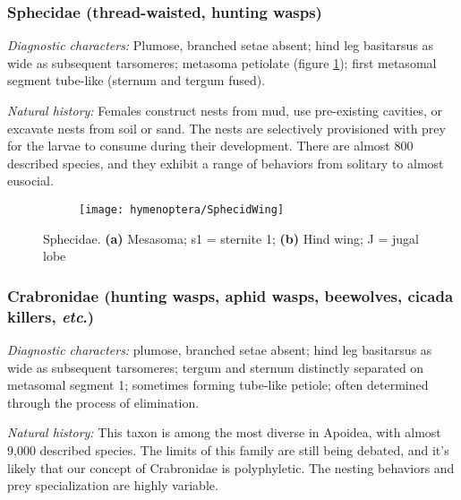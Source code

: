 \subsubsection{Sphecidae (thread-waisted, hunting wasps)}
\noindent{}\textit{Diagnostic characters:} Plumose, branched setae absent; hind leg basitarsus as wide as subsequent tarsomeres; metasoma petiolate (figure \ref{fig:sphecid1}); first metasomal segment tube-like (sternum and tergum fused).\vspace{3mm}

\noindent{}\textit{Natural history:} Females construct nests from mud, use pre-existing cavities, or excavate nests from soil or sand. The nests are selectively provisioned with prey for the larvae to consume during their development. There are almost 800 described species, and they exhibit a range of behaviors from solitary to almost eusocial.

\begin{figure}[ht!]
    \centering
    \begin{subfigure}[ht!]{0.45\textwidth}
        \caption{}
        \label{fig:sphecid1}
    \end{subfigure}
    \qquad
    \begin{subfigure}[ht!]{0.45\textwidth}
        \texttt{[image: hymenoptera/SphecidWing]}
        \caption{}
        \label{fig:sphecid2}
    \end{subfigure}
    \caption{Sphecidae. \textbf{(a)} Mesasoma; s1 = sternite 1; \textbf{(b)} Hind wing; J = jugal lobe \citep[][pg. 281]{goulet1993hymenoptera}}\label{fig:sphecids}
\end{figure}

\subsubsection{Crabronidae (hunting wasps, aphid wasps, beewolves, cicada killers, \textit{etc}.)}
\noindent{}\textit{Diagnostic characters:} plumose, branched setae absent; hind leg basitarsus as wide as subsequent tarsomeres; tergum and sternum distinctly separated on metasomal segment 1; sometimes forming tube-like petiole; often determined through the process of elimination.\vspace{3mm}

\noindent{}\textit{Natural history:} This taxon is among the most diverse in Apoidea, with almost 9,000 described species. The limits of this family are still being debated, and it's likely that our concept of Crabronidae is polyphyletic. The nesting behaviors and prey specialization are highly variable.


